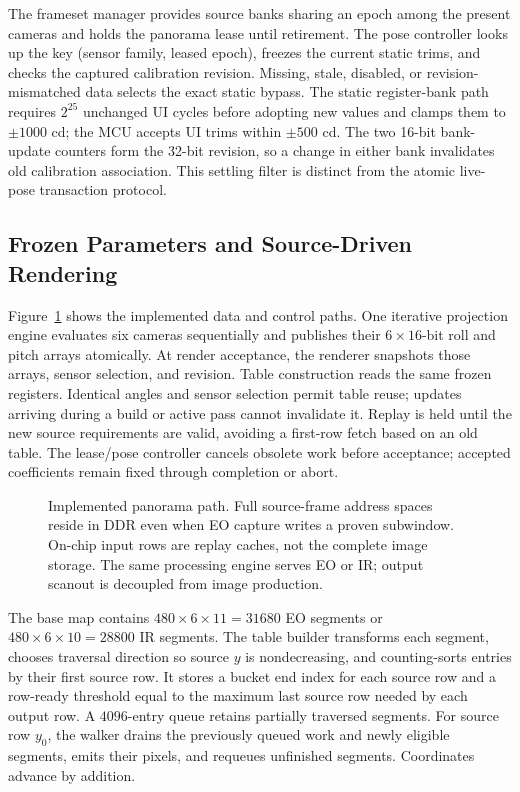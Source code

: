 The frameset manager provides source banks sharing an epoch among the
present cameras and holds the panorama lease until retirement. The pose
controller looks up the key (sensor family, leased epoch), freezes the
current static trims, and checks the captured calibration revision. Missing,
stale, disabled, or revision-mismatched data selects the exact static bypass.
The static register-bank path requires $2^{25}$ unchanged UI cycles before
adopting new values and clamps them to $\pm1000$ cd; the MCU accepts UI
trims within $\pm500$ cd. The two 16-bit bank-update counters form the
32-bit revision, so a change in either bank invalidates old calibration
association. This settling filter is distinct from the atomic live-pose
transaction protocol.

\subsection{Frozen Parameters and Source-Driven Rendering}
Figure~\ref{fig:gl_hardware} shows the implemented data and control paths.
One iterative projection engine evaluates six cameras sequentially and
publishes their $6\times16$-bit roll and pitch arrays atomically. At render
acceptance, the renderer snapshots those arrays, sensor selection, and
revision. Table construction reads the same frozen registers. Identical
angles and sensor selection permit table reuse; updates arriving during a
build or active pass cannot invalidate it. Replay is held until the new
source requirements are valid, avoiding a first-row fetch based on an old
table. The lease/pose controller cancels obsolete work before acceptance;
accepted coefficients remain fixed through completion or abort.

\begin{figure}[t]
\centering
\caption{Implemented panorama path. Full source-frame address spaces reside
in DDR even when EO capture writes a proven subwindow. On-chip input rows
are replay caches, not the complete image storage. The same processing
engine serves EO or IR; output scanout is decoupled from image production.}
\label{fig:gl_hardware}
\end{figure}

The base map contains $480\times6\times11=31680$ EO segments or
$480\times6\times10=28800$ IR segments. The table builder transforms each
segment, chooses traversal direction so source $y$ is nondecreasing, and
counting-sorts entries by their first source row. It stores a bucket end
index for each source row and a row-ready threshold equal to the maximum
last source row needed by each output row. A $4096$-entry queue retains
partially traversed segments. For source row $y_0$, the walker drains the
previously queued work and newly eligible segments, emits their pixels,
and requeues unfinished segments. Coordinates advance by addition.

